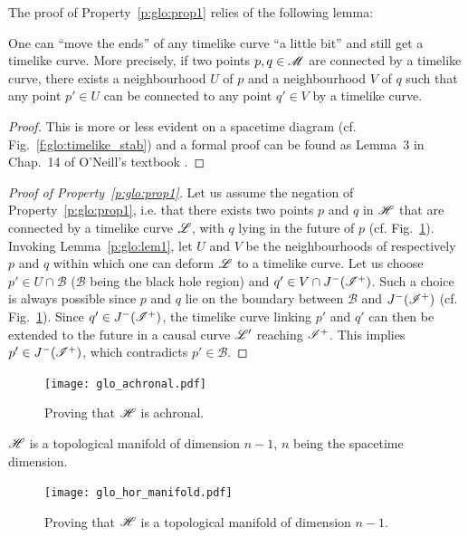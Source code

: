 The proof of Property~\ref{p:glo:prop1} relies of the following lemma:
\begin{lemma}
\label{p:glo:lem1}
One can ``move the ends'' of any timelike curve
``a little bit'' and still get a timelike curve. More precisely,
if two points $p,q\in\mathscr{M}$ are connected by a timelike curve,
there exists
a neighbourhood $U$ of $p$ and a neighbourhood $V$ of $q$ such that
any point $p'\in U$ can be connected to any point $q'\in V$ by a timelike curve.
\end{lemma}
\begin{proof}
This is more or less evident on a spacetime diagram (cf. Fig.~\ref{f:glo:timelike_stab})
and a formal proof
can be found as Lemma~3 in Chap.~14 of O'Neill's textbook \cite{ONeil83}.
\end{proof}

\begin{proof}[Proof of Property~\ref{p:glo:prop1}]
Let us assume the negation of Property~\ref{p:glo:prop1}, i.e. that there exists two points
$p$ and $q$
in $\mathscr{H}$ that are connected by a timelike curve $\mathscr{L}$, with $q$
lying in the future of $p$ (cf. Fig.~\ref{f:glo:achronal}).
Invoking Lemma~\ref{p:glo:lem1}, let $U$ and $V$ be the neighbourhoods of respectively
$p$ and $q$ within which one can deform $\mathscr{L}$ to a timelike curve.
Let us choose $p'\in U\cap\mathscr{B}$ ($\mathscr{B}$ being the black hole region)
and $q'\in V\cap J^-(\mathscr{I}^+)$. Such a choice is
always possible since $p$ and $q$ lie on the boundary between $\mathscr{B}$
and $J^-(\mathscr{I}^+)$ (cf. Fig.~\ref{f:glo:achronal}).
Since $q'\in J^-(\mathscr{I}^+)$, the timelike curve linking $p'$ and $q'$ can then be extended to the future in a causal curve $\mathscr{L}'$ reaching $\mathscr{I}^+$. This implies $p'\in J^-(\mathscr{I}^+)$,
which contradicts $p'\in\mathscr{B}$.
\end{proof}

\begin{figure}
\centerline{\texttt{[image: glo\_achronal.pdf]}}
\caption[]{\label{f:glo:achronal} \footnotesize
Proving that $\mathscr{H}$ is achronal.}
\end{figure}


\begin{prop}
\label{p:glo:prop2}
$\mathscr{H}$ is a topological manifold of dimension $n-1$, $n$ being the spacetime
dimension.
\end{prop}

\begin{figure}
\centerline{\texttt{[image: glo\_hor\_manifold.pdf]}}
\caption[]{\label{f:glo:hor_manifold} \footnotesize
Proving that $\mathscr{H}$ is a topological manifold of dimension $n-1$.}
\end{figure}

